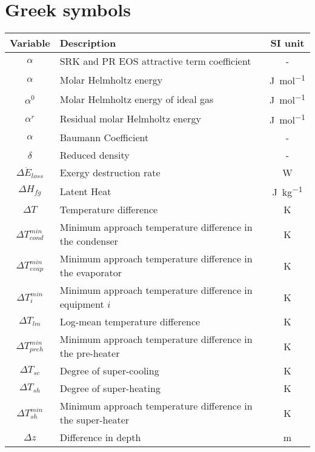 \section*{Greek symbols}
    \begin{longtable}{  c|p{10cm}|c}
        \hline
        \rowcolor{bluepoli!40}\textbf{Variable} & \textbf{Description} & \textbf{SI unit} \T\B \\
        \hline  \hline
        \endhead
        $\alpha$ & \ac{SRK} and \ac{PR} \ac{EOS} attractive term coefficient & \unit{-} \\[2px]
        $\alpha$ & Molar Helmholtz energy & \unit{\joule\per\mol} \\[2px]
        $\alpha^0$ & Molar Helmholtz energy of ideal gas & \unit{\joule\per\mol} \\[2px]
        $\alpha^r$ & Residual molar Helmholtz energy & \unit{\joule\per\mol} \\[2px]
        $\alpha$ & Baumann Coefficient & - \\[2px]
        $\delta$ & Reduced density & \unit{-} \\[2px]
        $\Delta \Dot{E}_{loss}$ & Exergy destruction rate & \unit{\watt} \\[2px]
        $\Delta H_{fg}$ & Latent Heat & \unit{\joule\per\kg} \\[2px]
        $\Delta T$ & Temperature difference & \unit{\K} \\[2px]
        $\Delta T_{cond}^{min}$ & Minimum approach temperature difference in the condenser & \unit{\K} \\[2px]
        $\Delta T_{evap}^{min}$ & Minimum approach temperature difference in the evaporator & \unit{\K} \\[2px]
        $\Delta T_i^{min}$ & Minimum approach temperature difference in equipment \(i\)& \unit{\K} \\[2px]
        $\Delta T_{lm}$ & Log-mean temperature difference & \unit{\K} \\[2px]
        $\Delta T_{preh}^{min}$ & Minimum approach temperature difference in the pre-heater& \unit{\K} \\[2px]
        $\Delta T_{sc}$ & Degree of super-cooling & \unit{\K} \\[2px]
        $\Delta T_{sh}$ & Degree of super-heating & \unit{\K} \\[2px]
        $\Delta T_{sh}^{min}$ & Minimum approach temperature difference in the super-heater & \unit{\K} \\[2px]
        $\Delta z $ & Difference in depth & \unit{\m} \\[2px]

\end{longtable}
